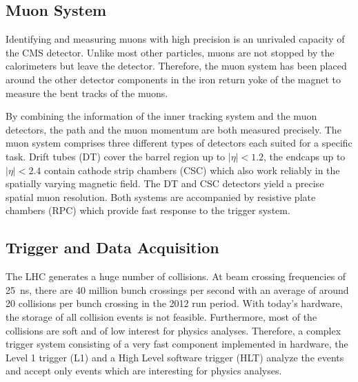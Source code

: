\subsection{Muon System}

Identifying and measuring muons with high precision is an unrivaled capacity of
the CMS detector. Unlike most other particles, muons are not stopped by the
calorimeters but leave the detector. Therefore, the muon system has been placed
around the other detector components in the iron return yoke of the magnet to
measure the bent tracks of the muons.

By combining the information of the inner tracking system and the muon
detectors, the path and the muon momentum are both measured precisely. The muon
system comprises three different types of detectors each suited for a specific
task. Drift tubes (DT) cover the barrel region up to $|\eta| < 1.2$, the endcaps
up to $|\eta| < 2.4$ contain cathode strip chambers (CSC) which also
work reliably in the spatially varying magnetic field. The DT and CSC detectors
yield a precise spatial muon resolution. Both systems are accompanied by
resistive plate chambers (RPC) which provide fast response to the trigger
system.

\subsection{Trigger and Data Acquisition}

The LHC generates a huge number of collisions. At beam crossing frequencies of
\SI{25}{\nano \second}, there are 40 million bunch crossings per second with an
average of around 20 collisions per bunch crossing in the 2012 run period. With
today's hardware, the storage of all collision events is not feasible.
Furthermore, most of the collisions are soft and of low interest for physics
analyses. Therefore, a complex trigger system consisting of a very fast
component implemented in hardware, the Level 1 trigger (L1) and a High Level
software trigger (HLT) analyze the events and accept only events which are
interesting for physics analyses.


